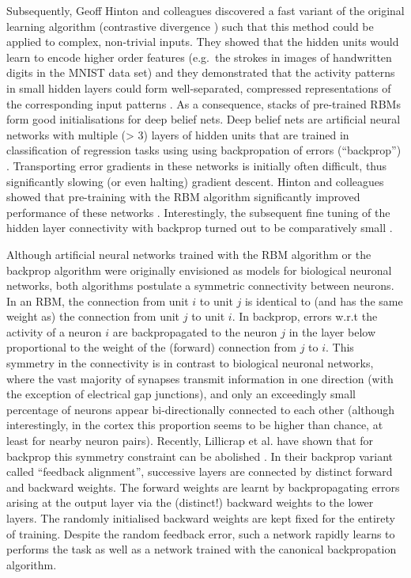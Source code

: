 \documentclass[11pt]{article}
\begin{document}
Subsequently, Geoff Hinton and colleagues discovered a fast variant of
the original learning algorithm (contrastive divergence
\citep{Hinton2002,Carreira-Perpinan2005}) such that this method could
be applied to complex, non-trivial inputs. They showed that the hidden
units would learn to encode higher order features (e.g.\ the strokes in
images of handwritten digits in the MNIST data set) and they
demonstrated that the activity patterns in small hidden layers could
form well-separated, compressed representations of the corresponding
input patterns \citep{Hinton2006b}. As a consequence, stacks of
pre-trained RBMs form good initialisations for deep belief nets. Deep
belief nets are artificial neural networks with multiple (\textgreater
3) layers of hidden units that are trained in classification of
regression tasks using using backpropation of errors (``backprop'')
\citep{Rumelhart1986}. Transporting error gradients in these networks
is initially often difficult, thus significantly slowing (or even
halting) gradient descent. Hinton and colleagues showed that
pre-training with the RBM algorithm significantly improved performance
of these networks \citep{Hinton2006a,Hinton2006b}. Interestingly, the
subsequent fine tuning of the hidden layer connectivity with backprop
turned out to be comparatively small \citep{Erhan2010}.

Although artificial neural networks trained with the RBM algorithm or
the backprop algorithm were originally envisioned as models for
biological neuronal networks, both algorithms postulate a symmetric
connectivity between neurons. In an RBM, the connection from unit $i$
to unit $j$ is identical to (and has the same weight as) the
connection from unit $j$ to unit $i$. In backprop, errors w.r.t the
activity of a neuron $i$ are backpropagated to the neuron $j$ in the
layer below proportional to the weight of the (forward) connection
from $j$ to $i$. %
This symmetry in the connectivity is in contrast to biological
neuronal networks, where the vast majority of synapses transmit
information in one direction (with the exception of electrical gap
junctions), and only an exceedingly small percentage of neurons appear
bi-directionally connected to each other (although interestingly, in
the cortex this proportion seems to be higher than chance, at least
for nearby neuron pairs). %
Recently, Lillicrap et al. have shown that for backprop this symmetry
constraint can be abolished \citep{Lillicrap2014}. In their backprop
variant called ``feedback alignment'', successive layers are connected
by distinct forward and backward weights. The forward weights are
learnt by backpropagating errors arising at the output layer via the
(distinct!) backward weights to the lower layers. The randomly
initialised backward weights are kept fixed for the entirety of
training. Despite the random feedback error, such a network rapidly
learns to performs the task as well as a network trained with the
canonical backpropation algorithm.
\end{document}
